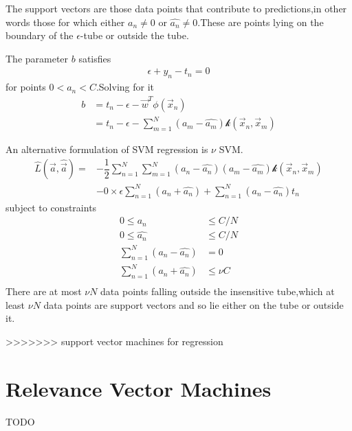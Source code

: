 The support vectors are those data points that contribute to predictions,in other words those for which either $a_n \neq 0$ or $\hat{a_n} \neq 0$.These are points lying on the boundary of the $\epsilon$-tube or outside the tube.

The parameter $b$ satisfies 
\begin{align}
\epsilon+y_n-t_n= 0
\end{align}
for points $0<a_n<C$.Solving for it
\begin{align}
b &= t_n-\epsilon-\vec{w}^T\phi(\vec{x}_n) \\
  &= t_n-\epsilon-\sum_{m=1}^{N}(a_m-\hat{a_m})\mathcal{k}(\vec{x}_n,\vec{x}_m)
\end{align}

An alternative formulation of SVM regression is $\nu$ SVM.
\begin{align}
\hat{L}(\vec{a},\hat{\vec{a}}) =&-\dfrac{1}{2}\sum_{n=1}^{N}\sum_{m=1}^{N}(a_n-\hat{a_n})(a_m-\hat{a_m})\mathcal{k}(\vec{x}_n,\vec{x}_m) \\
&-0\times\epsilon\sum_{n=1}^{N}(a_n+\hat{a_n})+\sum_{n=1}^{N}(a_n-\hat{a_n})t_n
\end{align}
subject to constraints
\begin{align}
0\leq a_n &\leq C/N\\
0\leq \hat{a_n} &\leq C/N \\
\sum_{n=1}^{N}(a_n-\hat{a_n}) &=0 \\
\sum_{n=1}^{N}(a_n+\hat{a_n}) &\leq \nu C \\
\end{align}
There are at most $\nu N$ data points falling outside the insensitive tube,which at least $\nu N$ data points are support vectors and so lie either on the tube or outside it.

>>>>>>> support vector machines for regression
\section{Relevance Vector Machines}
TODO










